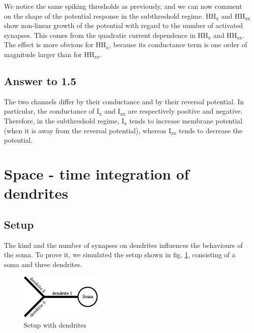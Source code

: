 \documentclass[a4paper, 10pt, conference]{ieeeconf}      %
\begin{document}
We notice the same spiking thresholds as previously, and we can now comment on the shape of the potential response in the subthreshold regime. HH$_\text{x}$ and HH$_\text{xx}$ show non-linear growth of the potential with regard to the number of activated synapses. This comes from the quadratic current dependence in HH$_\text{x}$ and HH$_\text{xx}$. The effect is more obvious for HH$_\text{x}$, because its conductance term is one order of magnitude larger than for HH$_\text{xx}$. \\





\subsection{Answer to 1.5}
The two channels differ by their conductance and by their reversal potential. In particular, the conductance of I$_\text{x}$ and I$_\text{xx}$ are respectively positive and negative. Therefore, in the subthreshold regime, I$_\text{x}$ tends to increase membrane potential (when it is away from the reversal potential), whereas I$_\text{xx}$ tends to decrease the potential. \\











\section{Space - time integration of dendrites}


\subsection{Setup}
The kind and the number of synapses on dendrites influences the behaviours of the soma. To prove it, we simulated the setup shown in fig. \ref{fig:soma_dendrites}, consisting of a soma and three dendrites.

\begin{figure}
\begin{center}
\includegraphics[width=4cm]{figures/soma.png}
\end{center}
\label{fig:soma_dendrites}
\caption{Setup with dendrites}
\end{figure}
\end{document}
